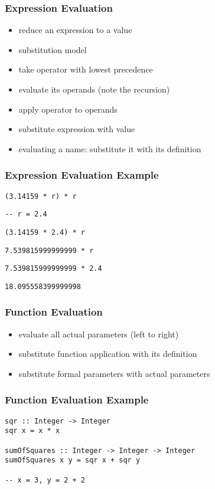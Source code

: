\documentclass[dvipsnames]{beamer}
\theoremstyle{plain}
\begin{document}
\begin{frame}
  \frametitle{Expression Evaluation}

  \begin{itemize}
    \item reduce an expression to a value
    \item substitution model

    \pause
    \bigskip
    \item take operator with lowest precedence
    \item evaluate its operands (note the recursion)
    \item apply operator to operands
    \item substitute expression with value

    \medskip
    \item evaluating a name: substitute it with its definition
  \end{itemize}
\end{frame}

\begin{frame}
  \frametitle{Expression Evaluation Example}

  \lstinline|(3.14159 * r) * r|

  \medskip
  \lstinline|-- r = 2.4|

  \pause
  \bigskip
  \lstinline|(3.14159 * 2.4) * r|

  \pause
  \medskip
  \lstinline|7.539815999999999 * r|

  \pause
  \medskip
  \lstinline|7.539815999999999 * 2.4|

  \pause
  \medskip
  \lstinline|18.095558399999998|
\end{frame}

\begin{frame}
  \frametitle{Function Evaluation}

  \begin{itemize}
    \item evaluate all actual parameters (left to right)

    \medskip
    \item substitute function application with its definition
    \item substitute formal parameters with actual parameters
  \end{itemize}
\end{frame}

\begin{frame}[fragile]
  \frametitle{Function Evaluation Example}

  \begin{lstlisting}
sqr :: Integer -> Integer
sqr x = x * x

sumOfSquares :: Integer -> Integer -> Integer
sumOfSquares x y = sqr x + sqr y

-- x = 3, y = 2 + 2
  \end{lstlisting}
\end{frame}
\end{document}
